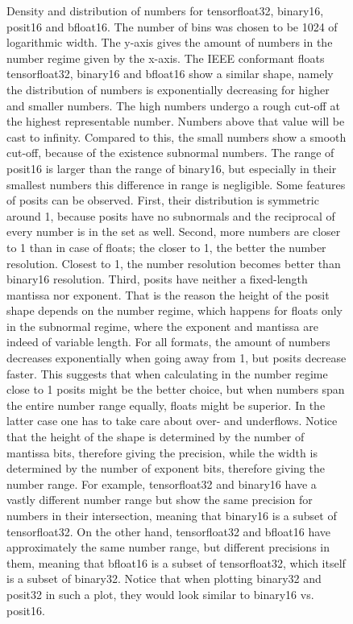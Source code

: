 \documentclass{article}
\theoremstyle{plain} %
\theoremstyle{convention} %
\theoremstyle{remark} %
\numberwithin{equation}{section}
\begin{document}
\begin{figure}
    \caption{Density and distribution of numbers for \gls{tensorfloat32}, \gls{binary16}, \gls{posit16} and \gls{bfloat16}. The number of bins was chosen to be \num{1024} of logarithmic width. The y-axis gives the amount of numbers in the number regime given by the x-axis. The IEEE conformant floats \gls{tensorfloat32}, \gls{binary16} and \gls{bfloat16} show a similar shape, namely the distribution of numbers is exponentially decreasing for higher and smaller numbers. The high numbers undergo a rough cut-off at the highest representable number. Numbers above that value will be cast to infinity. Compared to this, the small numbers show a smooth cut-off, because of the existence subnormal numbers. The range of \gls{posit16} is larger than the range of \gls{binary16}, but especially in their smallest numbers this difference in range is negligible. Some features of posits can be observed. First, their distribution is symmetric around \num{1}, because posits have no subnormals and the reciprocal of every number is in the set as well. Second, more numbers are closer to \num{1} than in case of floats; the closer to \num{1}, the better the number resolution. Closest to \num{1}, the number resolution becomes better than \gls{binary16} resolution. Third, posits have neither a fixed-length mantissa nor exponent. That is the reason the height of the posit shape depends on the number regime, which happens for floats only in the subnormal regime, where the exponent and mantissa are indeed of variable length. For all formats, the amount of numbers decreases exponentially when going away from \num{1}, but posits decrease faster. This suggests that when calculating in the number regime close to \num{1} posits might be the better choice, but when numbers span the entire number range equally, floats might be superior. In the latter case one has to take care about over- and underflows. Notice that the height of the shape is determined by the number of mantissa bits, therefore giving the precision, while the width is determined by the number of exponent bits, therefore giving the number range. For example, \gls{tensorfloat32} and \gls{binary16} have a vastly different number range but show the same precision for numbers in their intersection, meaning that \gls{binary16} is a subset of \gls{tensorfloat32}. On the other hand, \gls{tensorfloat32} and \gls{bfloat16} have approximately the same number range, but different precisions in them, meaning that \gls{bfloat16} is a subset of \gls{tensorfloat32}, which itself is a subset of \gls{binary32}. Notice that when plotting \gls{binary32} and \gls{posit32} in such a plot, they would look similar to \gls{binary16} vs. \gls{posit16}.}
    \label{fig:number_line}
\end{figure}
\end{document}
